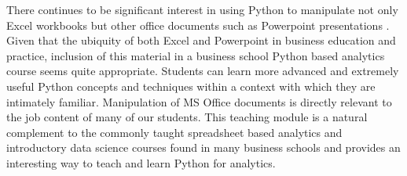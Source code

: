 \documentclass[ited]{informs3}                      %
\begin{document}
There continues to be significant interest in using Python to manipulate not only Excel workbooks but other office documents such as Powerpoint presentations \citep{cannyPythonpptx2013}. Given that the ubiquity of both Excel and Powerpoint in business education and practice, inclusion of this material in a business school Python based analytics course seems quite appropriate. Students can learn more advanced and extremely useful Python concepts and techniques within a context with which they are intimately familiar. Manipulation of MS Office documents is directly relevant to the job content of many of our students. This teaching module is a natural complement to the commonly taught spreadsheet based analytics and introductory data science courses found in many business schools and provides an interesting way to teach and learn Python for analytics.





%
%
%




\end{document}
